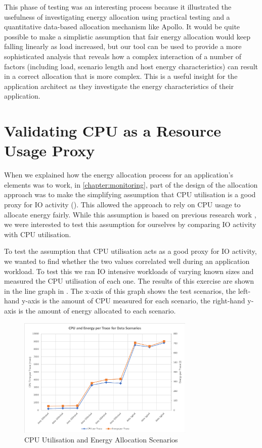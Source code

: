 This phase of testing was an interesting process because it illustrated the usefulness of investigating energy allocation using practical testing and a quantitative data-based allocation mechanism like Apollo.  It would be quite possible to make a simplistic assumption that fair energy allocation would keep falling linearly as load increased, but our tool can be used to provide a more sophisticated analysis that reveals how a complex interaction of a number of factors (including load, scenario length and host energy characteristics) can result in a correct allocation that is more complex.  This is a useful insight for the application architect as they investigate the energy characteristics of their application.

\section{Validating CPU as a Resource Usage Proxy}

When we explained how the energy allocation process for an application's elements was to work, in \cref{chapter:monitoring}, part of the design of the allocation approach was to make the simplifying assumption that CPU utilisation is a good proxy for IO activity ().  This allowed  the approach to rely on CPU usage to allocate energy fairly.  While this assumption is based on previous research work \cite{bashroush2018_hardwarerefresh} , we were interested to test this assumption for ourselves by comparing IO activity with CPU utilisation.

To test the assumption that CPU utilisation acts as a good proxy for IO activity, we wanted to find whether the two values correlated well during an application workload.  To test this we ran IO intensive workloads of varying known sizes and measured the CPU utilisation of each one.  The results of this exercise are shown in the line graph in .  The x-axis of this graph shows the test scenarios, the left-hand y-axis is the amount of CPU measured for each scenario, the right-hand y-axis is the amount of energy allocated to each scenario.

\begin{figure}
\centering
\includegraphics[width=0.75\textwidth,trim={2 2 2 2},clip]{Figures/validation-traceenergydatasize}
\caption{CPU Utilisation and Energy Allocation Scenarios}
\label{figure:validation-traceenergydatasize}
\end{figure}

